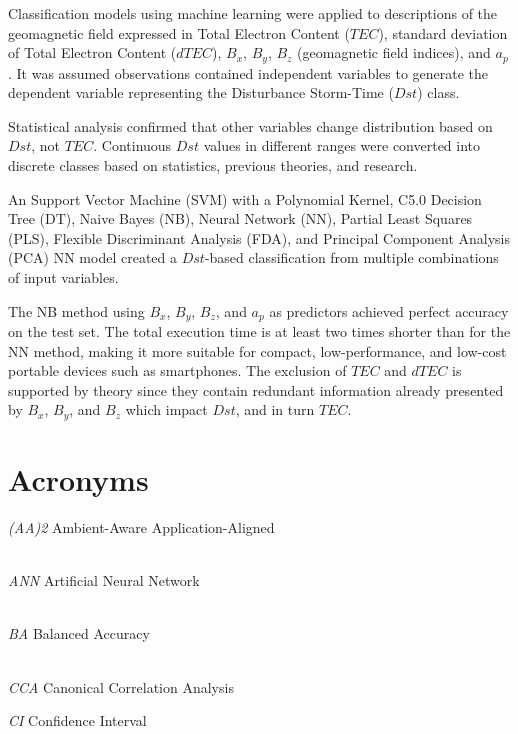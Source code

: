 \let\LaTeXcline\cline\documentclass[sn-mathphys-num]{sn-jnl}\let\cline\LaTeXcline
\begin{document}
Classification models using machine learning were applied to descriptions of the geomagnetic field expressed in Total Electron Content ($TEC$), standard deviation of Total Electron Content ($dTEC$), $B_{x}$, $B_{y}$, $B_{z}$ (geomagnetic field indices), and $a_{p}$. It was assumed observations contained independent variables to generate the dependent variable representing the Disturbance Storm-Time ($Dst$) class. 

Statistical analysis confirmed that other variables change distribution based on $Dst$, not $TEC$. Continuous $Dst$ values in different ranges were converted into discrete classes based on statistics, previous theories, and research. 

An Support Vector Machine (SVM) with a Polynomial Kernel, C5.0 Decision Tree (DT), Naive Bayes (NB), Neural Network (NN), Partial Least Squares (PLS), Flexible Discriminant Analysis (FDA), and Principal Component Analysis (PCA) NN model created a $Dst$-based classification from multiple combinations of input variables.

The NB method using $B_{x}$, $B_{y}$, $B_{z}$, and $a_{p}$ as predictors achieved perfect accuracy on the test set. The total execution time is at least two times shorter than for the NN method, making it more suitable for compact, low-performance, and low-cost portable devices such as smartphones. The exclusion of $TEC$ and $dTEC$ is supported by theory since they contain redundant information already presented by $B_{x}$, $B_{y}$, and $B_{z}$ which impact $Dst$, and in turn  $TEC$.

\clearpage

\section{Acronyms}
\label{sec:Acronyms}

\textit{(AA)2} Ambient-Aware Application-Aligned


\\[2\baselineskip]

\textit{ANN} Artificial Neural Network


\\[2\baselineskip]

\textit{BA} Balanced Accuracy


\\[2\baselineskip]

\textit{CCA} Canonical Correlation Analysis

\textit{CI} Confidence Interval
\end{document}
